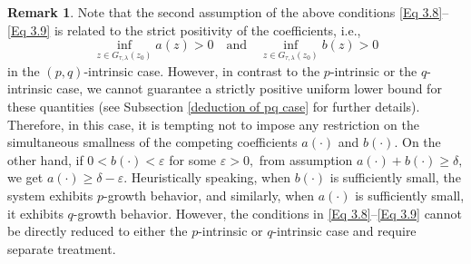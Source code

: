 \documentclass[11pt,oneside, english,reqno,twoside a4paper]{amsart}
\theoremstyle{definition}
\newtheorem{remark}{Remark}[section]
\numberwithin{theorem}{section}
\numberwithin{equation}{section}
\begin{document}
\begin{remark}\label{REM3.1}
Note that the second assumption of the above conditions \eqref{Eq 3.8}--\eqref{Eq 3.9} is related to the strict positivity of the coefficients, i.e.,
$$\inf_{z\in G_{\tau, \lambda}(z_0)}a(z)>0 \quad \text{and} \quad \inf_{z\in G_{\tau, \lambda}(z_0)}b(z)>0$$
in the $(p, q)$-intrinsic case. However, in contrast to the $p$-intrinsic or the $q$-intrinsic case, we cannot guarantee a strictly positive uniform lower bound for these quantities (see Subsection \ref{deduction of pq case} for further details). Therefore, in this case, it is tempting not to impose any restriction on the simultaneous smallness of the competing coefficients $a(\cdot)$ and $b(\cdot)$. On the other hand, if $0<b(\cdot)<\varepsilon$ for some $\varepsilon >0,$ from assumption $a(\cdot)+b(\cdot)\geq \delta,$ we get $a(\cdot)\geq \delta-\varepsilon.$ Heuristically speaking, when $b(\cdot)$ is sufficiently small, the system exhibits $p$-growth behavior, and similarly, when $a(\cdot)$ is sufficiently small, it exhibits $q$-growth behavior. However, the conditions in \eqref{Eq 3.8}--\eqref{Eq 3.9} cannot be directly reduced to either the $p$-intrinsic or $q$-intrinsic case and require separate treatment.
\end{remark}


\end{document}
